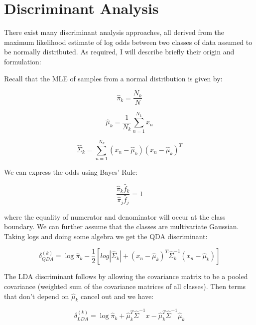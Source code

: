 \documentclass[conference,final,]{IEEEtran}
\begin{document}
\hypertarget{discriminant-analysis}{%
\section{Discriminant Analysis}\label{discriminant-analysis}}

There exist many discriminant analysis approaches, all derived from the
maximum likelihood estimate of log odds between two classes of data
assumed to be normally distributed. As required, I will describe briefly
their origin and formulation:

Recall that the MLE of samples from a normal distribution is given by:

\begin{equation}
\hat{\pi}_k = \frac{N_k}{N}
\end{equation}

\begin{equation}
\hat{\mu}_k = \frac{1}{N_k}\sum^{N_k}_{n=1}x_n
\end{equation}

\begin{equation}
\hat{\Sigma}_k = \sum^{N_k}_{n=1}(x_n - \hat \mu_k)(x_n - \hat \mu_k)^T
\end{equation}

We can express the odds using Bayes' Rule:

\begin{equation}
\frac {\hat {\pi}_k \hat {f}_k} {\hat {\pi}_j \hat {f}_j} = 1
\end{equation}

where the equality of numerator and denominator will occur at the class
boundary. We can further assume that the classes are multivariate
Gaussian. Taking logs and doing some algebra we get the QDA
discriminant:

\begin{equation}
\delta_{QDA}^{(k)}  = \log \hat \pi _k - \frac 1 2 [log |\hat \Sigma _k| + (x_n - \hat \mu_k)^T\hat \Sigma _k ^{-1}(x_n - \hat \mu_k)]
\end{equation}

The LDA discriminant follows by allowing the covariance matrix to be a
pooled covariance (weighted sum of the covariance matrices of all
classes). Then terms that don't depend on \(\hat{\mu}_k\) cancel out and
we have:

\begin{equation}
\delta_{LDA}^{(k)}  = \log \hat {\pi} _k + \hat {\mu} _k ^T \hat {\Sigma} ^{-1} x -\hat {\mu} _k ^T \hat {\Sigma} ^{-1} \hat {\mu} _k
\end{equation}
\end{document}
